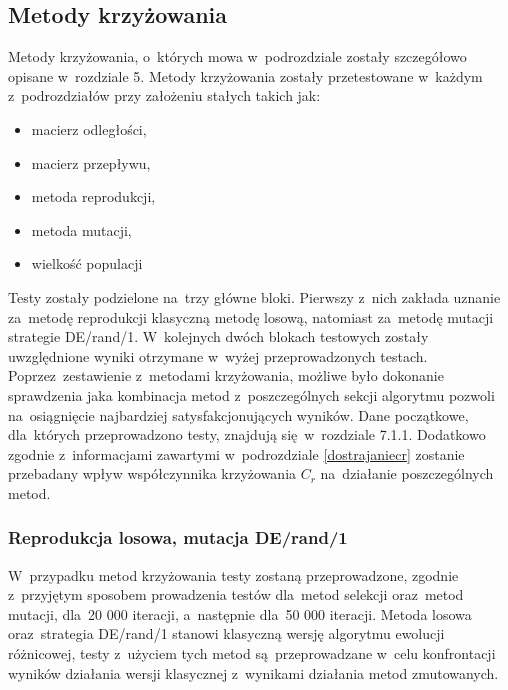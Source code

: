\subsection{Metody krzyżowania}\label{crossover}

Metody krzyżowania, o~których mowa w~podrozdziale zostały szczegółowo opisane w~rozdziale 5. Metody krzyżowania zostały przetestowane w~każdym z~podrozdziałów przy założeniu stałych takich jak:
\begin{itemize}
\item macierz odległości,
\item macierz przepływu,
\item metoda reprodukcji,
\item metoda mutacji,
\item wielkość populacji
\end{itemize}
\par
Testy zostały podzielone na~trzy główne bloki. Pierwszy z~nich zakłada uznanie za~metodę reprodukcji klasyczną metodę losową, natomiast za~metodę mutacji strategie DE/rand/1. W~kolejnych dwóch blokach testowych zostały uwzględnione wyniki otrzymane w~wyżej przeprowadzonych testach. Poprzez~zestawienie z~metodami krzyżowania, możliwe było dokonanie sprawdzenia jaka kombinacja metod z~poszczególnych sekcji algorytmu pozwoli na~osiągnięcie najbardziej satysfakcjonujących wyników. Dane początkowe, dla~których przeprowadzono testy, znajdują się~w~rozdziale 7.1.1. Dodatkowo zgodnie z~informacjami zawartymi w~podrozdziale \ref{dostrajaniecr} zostanie przebadany wpływ współczynnika krzyżowania $C_{r}$ na~działanie poszczególnych metod.\\

\subsubsection{Reprodukcja losowa, mutacja DE/rand/1}

W~przypadku metod krzyżowania testy zostaną przeprowadzone, zgodnie z~przyjętym sposobem prowadzenia testów dla~metod selekcji oraz~metod mutacji, dla~20 000 iteracji, a~następnie dla~50 000 iteracji. Metoda losowa oraz~strategia DE/rand/1 stanowi klasyczną wersję algorytmu ewolucji różnicowej, testy z~użyciem tych metod są~przeprowadzane w~celu konfrontacji wyników działania wersji klasycznej z~wynikami działania metod zmutowanych.\\

